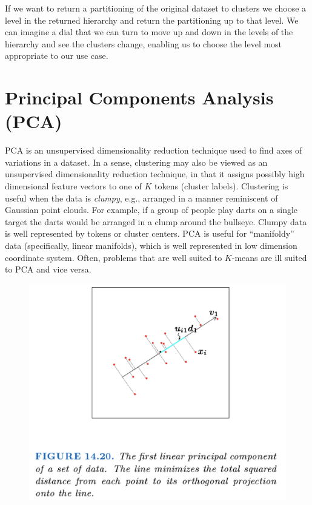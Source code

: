 \documentclass[a4paper]{article}
\begin{document}
If we want to return a partitioning of the original dataset to clusters we choose a level in the returned hierarchy and return the partitioning up to that level. We can imagine a dial that we can turn to move up and down in the levels of the hierarchy and see the clusters change, enabling us to choose the level most appropriate to our use case. 

\section{Principal Components Analysis (PCA)}
PCA is an unsupervised dimensionality reduction technique used to find axes of variations in a dataset.  In a sense, clustering may also be viewed as an unsupervised dimensionality reduction technique, in that it assigns possibly high dimensional feature vectors to one of $K$ tokens (cluster labels). Clustering is useful when the data is \textit{clumpy}, e.g., arranged in a manner reminiscent of Gaussian point clouds. For example, if a group of people play darts on a single target the darts would be arranged in a clump around the bullseye. Clumpy data is well represented by tokens or cluster centers. PCA is useful for ``manifoldy'' data (specifically, linear manifolds), which is well represented in low dimension coordinate system.  Often, problems that are well suited to $K$-means are ill suited to PCA and vice versa.

\begin{figure}
\centering
\includegraphics[width=1.0\textwidth]{TwoDimReduction.png}
\caption{\label{fig:2DimReduction} }
\end{figure}
\end{document}
